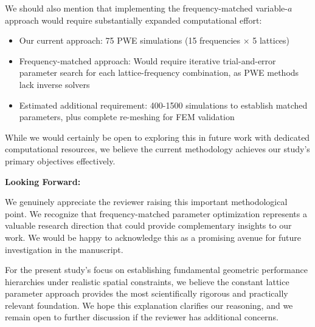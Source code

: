 \documentclass[11pt,a4paper]{article}
\newenvironment{responsebox}{%
    \par\medskip\noindent{\color{responsecolor}\rule{\linewidth}{2pt}}\par
    \noindent{\color{responsecolor}\bfseries Response}\par\smallskip
}{%
    \par\noindent{\color{responsecolor}\rule{\linewidth}{0.5pt}}\medskip
}
\begin{document}
\begin{responsebox}
We should also mention that implementing the frequency-matched variable-$a$ approach would require substantially expanded computational effort:

\begin{itemize}
    \item Our current approach: 75 PWE simulations (15 frequencies $\times$ 5 lattices)
    \item Frequency-matched approach: Would require iterative trial-and-error parameter search for each lattice-frequency combination, as PWE methods lack inverse solvers
    \item Estimated additional requirement: 400-1500 simulations to establish matched parameters, plus complete re-meshing for FEM validation
\end{itemize}

While we would certainly be open to exploring this in future work with dedicated computational resources, we believe the current methodology achieves our study's primary objectives effectively.

\textbf{Looking Forward:}

We genuinely appreciate the reviewer raising this important methodological point. We recognize that frequency-matched parameter optimization represents a valuable research direction that could provide complementary insights to our work. We would be happy to acknowledge this as a promising avenue for future investigation in the manuscript.

For the present study's focus on establishing fundamental geometric performance hierarchies under realistic spatial constraints, we believe the constant lattice parameter approach provides the most scientifically rigorous and practically relevant foundation. We hope this explanation clarifies our reasoning, and we remain open to further discussion if the reviewer has additional concerns.
\end{responsebox}
\end{document}
